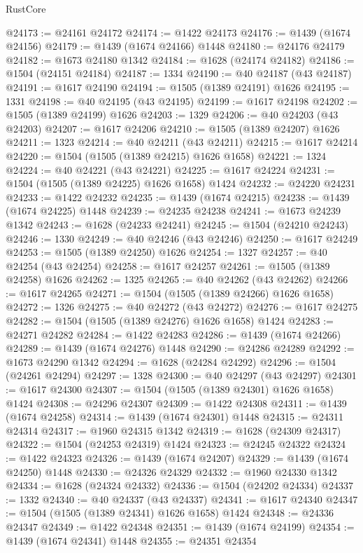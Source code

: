 \begin{lexlean}{RustCore}
\begin{coremodule}
@24173 := @24161 @24172
@24174 := @1422 @24173
@24176 := @1439 (@1674 @24156)
@24179 := @1439 (@1674 @24166) @1448
@24180 := @24176 @24179
@24182 := @1673 @24180 @1342
@24184 := @1628 (@24174 @24182)
@24186 := @1504 (@24151 @24184)
@24187 := 1334
@24190 := @40 @24187 (@43 @24187)
@24191 := @1617 @24190
@24194 := @1505 (@1389 @24191) @1626
@24195 := 1331
@24198 := @40 @24195 (@43 @24195)
@24199 := @1617 @24198
@24202 := @1505 (@1389 @24199) @1626
@24203 := 1329
@24206 := @40 @24203 (@43 @24203)
@24207 := @1617 @24206
@24210 := @1505 (@1389 @24207) @1626
@24211 := 1323
@24214 := @40 @24211 (@43 @24211)
@24215 := @1617 @24214
@24220 := @1504 (@1505 (@1389 @24215) @1626 @1658)
@24221 := 1324
@24224 := @40 @24221 (@43 @24221)
@24225 := @1617 @24224
@24231 := @1504 (@1505 (@1389 @24225) @1626 @1658) @1424
@24232 := @24220 @24231
@24233 := @1422 @24232
@24235 := @1439 (@1674 @24215)
@24238 := @1439 (@1674 @24225) @1448
@24239 := @24235 @24238
@24241 := @1673 @24239 @1342
@24243 := @1628 (@24233 @24241)
@24245 := @1504 (@24210 @24243)
@24246 := 1330
@24249 := @40 @24246 (@43 @24246)
@24250 := @1617 @24249
@24253 := @1505 (@1389 @24250) @1626
@24254 := 1327
@24257 := @40 @24254 (@43 @24254)
@24258 := @1617 @24257
@24261 := @1505 (@1389 @24258) @1626
@24262 := 1325
@24265 := @40 @24262 (@43 @24262)
@24266 := @1617 @24265
@24271 := @1504 (@1505 (@1389 @24266) @1626 @1658)
@24272 := 1326
@24275 := @40 @24272 (@43 @24272)
@24276 := @1617 @24275
@24282 := @1504 (@1505 (@1389 @24276) @1626 @1658) @1424
@24283 := @24271 @24282
@24284 := @1422 @24283
@24286 := @1439 (@1674 @24266)
@24289 := @1439 (@1674 @24276) @1448
@24290 := @24286 @24289
@24292 := @1673 @24290 @1342
@24294 := @1628 (@24284 @24292)
@24296 := @1504 (@24261 @24294)
@24297 := 1328
@24300 := @40 @24297 (@43 @24297)
@24301 := @1617 @24300
@24307 := @1504 (@1505 (@1389 @24301) @1626 @1658) @1424
@24308 := @24296 @24307
@24309 := @1422 @24308
@24311 := @1439 (@1674 @24258)
@24314 := @1439 (@1674 @24301) @1448
@24315 := @24311 @24314
@24317 := @1960 @24315 @1342
@24319 := @1628 (@24309 @24317)
@24322 := @1504 (@24253 @24319) @1424
@24323 := @24245 @24322
@24324 := @1422 @24323
@24326 := @1439 (@1674 @24207)
@24329 := @1439 (@1674 @24250) @1448
@24330 := @24326 @24329
@24332 := @1960 @24330 @1342
@24334 := @1628 (@24324 @24332)
@24336 := @1504 (@24202 @24334)
@24337 := 1332
@24340 := @40 @24337 (@43 @24337)
@24341 := @1617 @24340
@24347 := @1504 (@1505 (@1389 @24341) @1626 @1658) @1424
@24348 := @24336 @24347
@24349 := @1422 @24348
@24351 := @1439 (@1674 @24199)
@24354 := @1439 (@1674 @24341) @1448
@24355 := @24351 @24354

\end{coremodule}
\end{lexlean}
